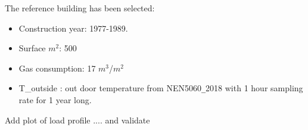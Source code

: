 \documentclass[a4paper,10pt]{article}
\begin{document}

The reference building has been selected:

    \begin{itemize}
      \item Construction year: 1977-1989.
      \item Surface $m^2$: 500
      \item Gas consumption: 17 $m^3$/$m^2$
      \item T{\_outside} : out door temperature from NEN5060\texttt{\_}2018 with 1 hour sampling rate for 1 year long.
    \end{itemize}
    
Add plot of load profile .... and validate











\end{document}
